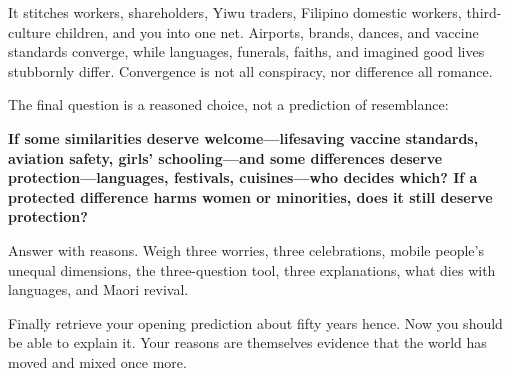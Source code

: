 It stitches workers, shareholders, Yiwu traders, Filipino domestic workers, third-culture children, and you into one net. Airports, brands, dances, and vaccine standards converge, while languages, funerals, faiths, and imagined good lives stubbornly differ. Convergence is not all conspiracy, nor difference all romance.

The final question is a reasoned choice, not a prediction of resemblance:

\textbf{If some similarities deserve welcome---lifesaving vaccine standards, aviation safety, girls' schooling---and some differences deserve protection---languages, festivals, cuisines---who decides which? If a protected difference harms women or minorities, does it still deserve protection?}

Answer with reasons. Weigh three worries, three celebrations, mobile people's unequal dimensions, the three-question tool, three explanations, what dies with languages, and Maori revival.

Finally retrieve your opening prediction about fifty years hence. Now you should be able to explain it. Your reasons are themselves evidence that the world has moved and mixed once more.
